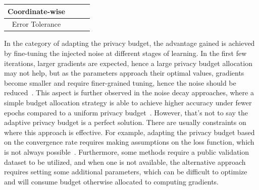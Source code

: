 \begin{table}[]
\begin{tabular}{|c|ccc|}
Coordinate-wise                   & \multicolumn{1}{c|}{}                        & \multicolumn{1}{c|}{\cite{RefWorks:RefID:35-pichapati2019adaclip:}}                  &                        \\ \hline
Error Tolerance                   & \multicolumn{1}{c|}{}                        & \multicolumn{1}{c|}{}                  &     \cite{RefWorks:RefID:38-koskelalearning}                   \\ \hline
\end{tabular}
\end{table}

In the category of adapting the privacy budget, the advantage gained is achieved by fine-tuning the injected noise at different stages of learning. In the first few iterations, larger gradients are expected, hence a large privacy budget allocation may not help, but as the parameters approach their optimal values, gradients become smaller and require finer-grained tuning, hence the noise should be reduced~\cite{concentrated}. This aspect is further observed in the noise decay approaches, where a simple budget allocation strategy is able to achieve higher accuracy under fewer epochs compared to a uniform privacy budget~\cite{RefWorks:RefID:47-yu2019differentially}. However, that’s not to say the adaptive privacy budget is a perfect solution. There are usually constraints on where this approach is effective. For example, adapting the privacy budget based on the convergence rate requires making assumptions on the loss function, which is not always possible~\cite{RefWorks:RefID:48-fay2023adaptive}. Furthermore, some methods require a public validation dataset to be utilized, and when one is not available, the alternative approach requires setting some additional parameters, which can be difficult to optimize~\cite{RefWorks:RefID:47-yu2019differentially} and will consume budget otherwise allocated to computing gradients.

